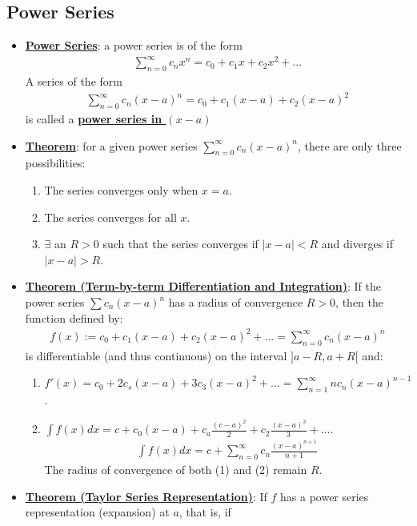 \documentclass[11pt]{article}
\newcommand{\dfn}[1]{\underline{\textbf{#1}}}
\begin{document}
\subsection{Power Series}
\begin{itemize}[noitemsep]
	\item \dfn{Power Series}: a power series is of the form 
	\begin{align}
		\sum_{n=0}^\infty c_n x^n = c_0 + c_1 x + c_2 x^2 + ... 	
	\end{align}
	A series of the form 
	\begin{align}
		\sum_{n=0}^\infty c_n (x-a)^n = c_0 + c_1 (x-a) + c_2 (x-a)^2 
	\end{align}
	is called a \dfn{power series in $(x-a)$}
	\item \dfn{Theorem}: for a given power series $\sum_{n=0}^\infty c_n (x-a)^n$, there are only three possibilities: 
	\begin{enumerate}[noitemsep]
		\item The series converges only when $x=a$. 
		\item The series converges for all $x$. 
		\item $\exists$ an $R>0$ such that the series converges if $|x-a| < R$ and diverges if $|x-a| > R$. 
	\end{enumerate}
	\item \dfn{Theorem (Term-by-term Differentiation and Integration)}: If the power series $\sum c_n (x-a)^n$ has a radius of convergence $R>0$, then the function defined by: 
	\begin{align}
		f(x) := c_0 + c_1 (x-a) + c_2 (x-a)^2 + ... = \sum_{n=0}^\infty c_n (x-a)^n 	
	\end{align}
	is differentiable (and thus continuous) on the interval $]a-R, a+R[$ and:
	\begin{enumerate}[noitemsep]
		\item $f'(x) = c_0 + 2c_s(x-a) + 3c_3 (x-a)^2 + ... = \sum_{n=1}^\infty nc_n (x-a)^{n-1}$. 
		\item $\int f(x) dx = c + c_0 (x-a) + c_a \frac{(c-a)^2}{2} + c_2 \frac{(x-a)^3}{3} + .... $
		\begin{align}
			\int f(x) dx = c + \sum_{n=0}^\infty c_n \frac{(x-a)^{n+1}}{n+1}	
		\end{align}
	The radius of convergence of both (1) and (2) remain $R$. 
	\end{enumerate}
	\item \dfn{Theorem (Taylor Series Representation)}: If $f$ has a power series representation (expansion) at $a$, that is, if 

\end{itemize}
\end{document}
